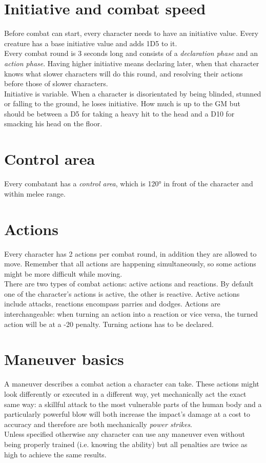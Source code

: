 \section{Initiative and combat speed}
Before combat can start, every character needs to have an initiative value. Every creature has a base initiative value and adds 1D5 to it.\\
Every combat round is 3 seconds long and consists of a \textit{declaration phase} and an \textit{action phase}. Having higher initiative means declaring later, when that character knows what slower characters will do this round, and resolving their actions before those of slower characters.\\
Initiative is variable. When a character is disorientated by being blinded, stunned or falling to the ground, he loses initiative. How much is up to the GM but should be between a D5 for taking a heavy hit to the head and a D10 for smacking his head on the floor.
\section{Control area}
Every combatant has a \emph{control area}, which is 120° in front of the character and within melee range. 
\section{Actions}
Every character has 2 actions per combat round, in addition they are allowed to move. Remember that all actions are happening simultaneously, so some actions might be more difficult while moving.\\
There are two types of combat actions: active actions and reactions. By default one of the character’s actions is active, the other is reactive. Active actions include attacks, reactions encompass parries and dodges. Actions are interchangeable: when turning an action into a reaction or vice versa, the turned action will be at a -20 penalty. Turning actions has to be declared.
\section{Maneuver basics}
A maneuver describes a combat action a character can take. These actions might look differently or executed in a different way, yet mechanically act the exact same way: a skillful attack to the most vulnerable parts of the human body and a particularly powerful blow will both increase the impact’s damage at a cost to accuracy and therefore are both mechanically \textit{power strikes}.\\
Unless specified otherwise any character can use any maneuver even without being properly trained (i.e. knowing the ability) but all penalties are twice as high to achieve the same results.
